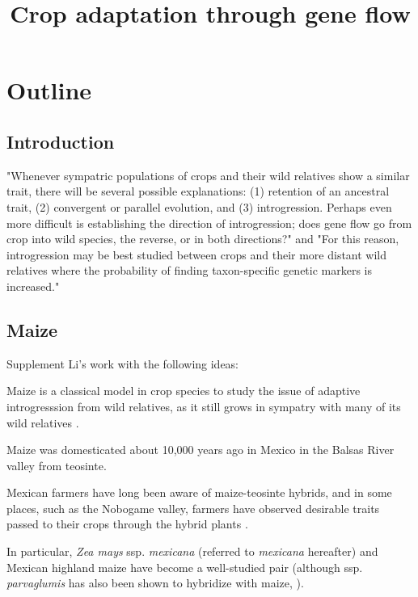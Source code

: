\documentclass[11pt]{article}
\title{Crop adaptation through gene flow}
\begin{document}
\maketitle

\section*{Outline}

\subsection*{Introduction}

 "Whenever sympatric populations of crops and their wild relatives show a similar trait, there will be several possible explanations: (1) retention of an ancestral trait, (2) convergent or parallel evolution, and (3) introgression.  Perhaps even more difficult is establishing the direction of introgression; does gene flow go from crop into wild species, the reverse, or in both directions?" and "For this reason, introgression may be best studied between crops and their more distant wild relatives where the probability of finding taxon-specific genetic markers is increased." \cite{doebley1990molecular}

\subsection*{Maize}


Supplement Li's work with the following ideas:


Maize is a classical model in crop species to study the issue of adaptive introgresssion from wild relatives, as it still grows in sympatry with many of its wild relatives \cite{hufford2013}.

Maize was domesticated about 10,000 years ago in Mexico \cite{smith1997initial} \cite{hufford2012comparative} in the Balsas River valley \cite{matsuoka2002single} from teosinte.

Mexican farmers have long been aware of maize-teosinte hybrids, and in some places, such as the Nobogame valley, farmers have observed desirable traits passed to their crops through the hybrid plants \cite{wilkes1977hybridization} \cite{lumholtz1902unknown} \cite{wilkes1970teosinte}.

In particular, \emph{Zea mays} ssp. \emph{mexicana} (referred to \emph{mexicana} hereafter) and Mexican highland maize have become a well-studied pair (although ssp. \emph{parvaglumis} has also been shown to hybridize with maize, \cite{wilkes1977hybridization}).
\end{document}

